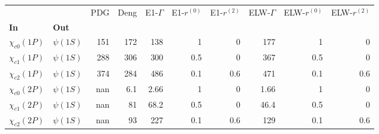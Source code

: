 \begin{tabular}{l|l|r|r|r|r|r|r|r|r}
\toprule
                &            &  PDG &  Deng &  E1-$\Gamma$ &  E1-$r^{(0)}$ &  E1-$r^{(2)}$ &  ELW-$\Gamma$ &  ELW-$r^{(0)}$ &  ELW-$r^{(2)}$ \\
\textbf{In} & \textbf{Out} &      &       &              &               &               &               &                &                \\
\midrule
\textbf{$\chi_{c0}(1P)$} & \textbf{$\psi(1S)$} &  151 &   172 &          138 &             1 &             0 &           177 &              1 &              0 \\
\textbf{$\chi_{c1}(1P)$} & \textbf{$\psi(1S)$} &  288 &   306 &          300 &           0.5 &             0 &           367 &            0.5 &              0 \\
\textbf{$\chi_{c2}(1P)$} & \textbf{$\psi(1S)$} &  374 &   284 &          486 &           0.1 &           0.6 &           471 &            0.1 &            0.6 \\
\textbf{$\chi_{c0}(2P)$} & \textbf{$\psi(1S)$} &  nan &   6.1 &         2.66 &             1 &             0 &          1.66 &              1 &              0 \\
\textbf{$\chi_{c1}(2P)$} & \textbf{$\psi(1S)$} &  nan &    81 &         68.2 &           0.5 &             0 &          46.4 &            0.5 &              0 \\
\textbf{$\chi_{c2}(2P)$} & \textbf{$\psi(1S)$} &  nan &    93 &          227 &           0.1 &           0.6 &           129 &            0.1 &            0.6 \\
\bottomrule
\end{tabular}
